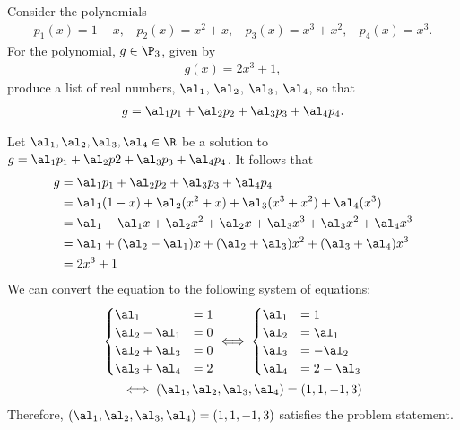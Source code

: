 \begin{question}
	\normalfont

Consider the polynomials	\begin{align*}
		p_1(x) = 1-x,\ \ \ \ p_2(x)=x^2+x,\ \ \ \ p_3(x)=x^3+x^2,\ \ \ \ p_4(x)=x^3.
	\end{align*}
	For the polynomial, $g\in\P_3$, given by
	\begin{align*}
		g(x)=2x^3+1,
	\end{align*}
	produce a list of real numbers, $\al_1$, $\al_2$, $\al_3$, $\al_4$, so that
	\begin{align*}
		g = \al_1 p_1 + \al_2 p_2 + \al_3 p_3 + \al_4 p_4.
	\end{align*}

\end{question}

\begin{sol}
    Let $\al_1,\al_2,\al_3,\al_4\in\R$ be a solution to $g=\al_1p_1+\al_2p2+\al_3p_3+\al_4p_4$. It follows that 
    \[
        \begin{aligned}
            g &= \al_1p_1+\al_2p_2+\al_3p_3+\al_4p_4\\
              &= \al_1(1-x)+\al_2(x^2+x)+\al_3(x^3+x^2)+\al_4(x^3)\\
              &= \al_1-\al_1x+\al_2x^2+\al_2x+\al_3x^3+\al_3x^2+\al_4x^3\\
              &= \al_1+(\al_2-\al_1)x+(\al_2+\al_3)x^2+(\al_3+\al_4)x^3\\
              &= 2x^3+1
        \end{aligned}
    \]
    We can convert the equation to the following system of equations:
    \begin{align*}
        \begin{cases}
            \al_1       &= 1\\
            \al_2-\al_1 &= 0\\
            \al_2+\al_3 &= 0\\
            \al_3+\al_4 &= 2
        \end{cases}
        \iff
        \begin{cases}
            \al_1 &= 1\\
            \al_2 &= \al_1\\
            \al_3 &= -\al_2\\
            \al_4 &= 2-\al_3
        \end{cases}\\
        \iff
        (\al_1,\al_2,\al_3,\al_4)=(1,1,-1,3)
    \end{align*}
    Therefore, $(\al_1,\al_2,\al_3,\al_4)=(1,1,-1,3)$ satisfies the problem statement.
\end{sol}
